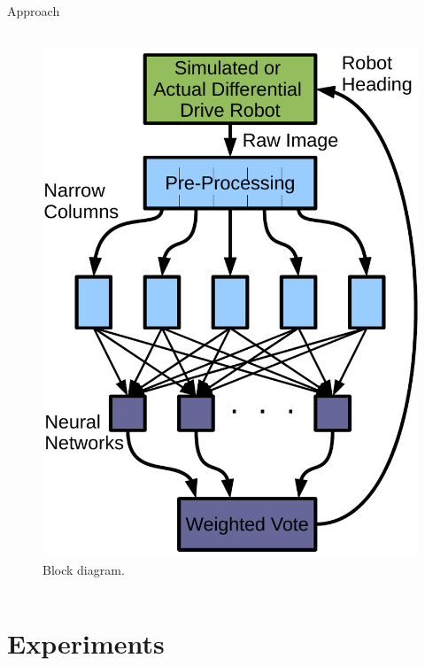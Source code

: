 \documentclass{beamer}
\begin{document}
\begin{frame}{Approach}
\begin{columns}[c c]
				\begin{figure}
					\begin{center}
						\includegraphics[width=\textwidth]{block_diagram.pdf}
					\end{center}
					\caption{Block diagram.}
					\label{block_diagram}
				\end{figure}

		\end{columns}
	\end{frame}

\section{Experiments}
\end{document}
